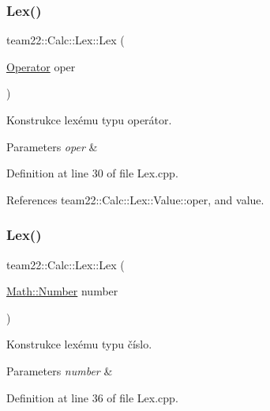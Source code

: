 \subsubsection{\texorpdfstring{Lex()}{Lex()}\hspace{0.1cm}{\footnotesize\ttfamily [1/2]}}
{\footnotesize\ttfamily team22\+::\+Calc\+::\+Lex\+::\+Lex (\begin{DoxyParamCaption}\item[{\hyperlink{classteam22_1_1_calc_1_1_lex_a61d29fc4878a3b36d2de2f13c56ed932}{Operator}}]{oper }\end{DoxyParamCaption})}



Konstrukce lexému typu operátor. 


\begin{DoxyParams}{Parameters}
{\em oper} & \\
\hline
\end{DoxyParams}


Definition at line 30 of file Lex.\+cpp.



References team22\+::\+Calc\+::\+Lex\+::\+Value\+::oper, and value.

\mbox{\label{classteam22_1_1_calc_1_1_lex_a95deefe4c4e987fef602fbd621bac095}} 
\subsubsection{\texorpdfstring{Lex()}{Lex()}\hspace{0.1cm}{\footnotesize\ttfamily [2/2]}}
{\footnotesize\ttfamily team22\+::\+Calc\+::\+Lex\+::\+Lex (\begin{DoxyParamCaption}\item[{\hyperlink{classteam22_1_1_math_1_1_number}{Math\+::\+Number}}]{number }\end{DoxyParamCaption})}



Konstrukce lexému typu číslo. 


\begin{DoxyParams}{Parameters}
{\em number} & \\
\hline
\end{DoxyParams}


Definition at line 36 of file Lex.\+cpp.



